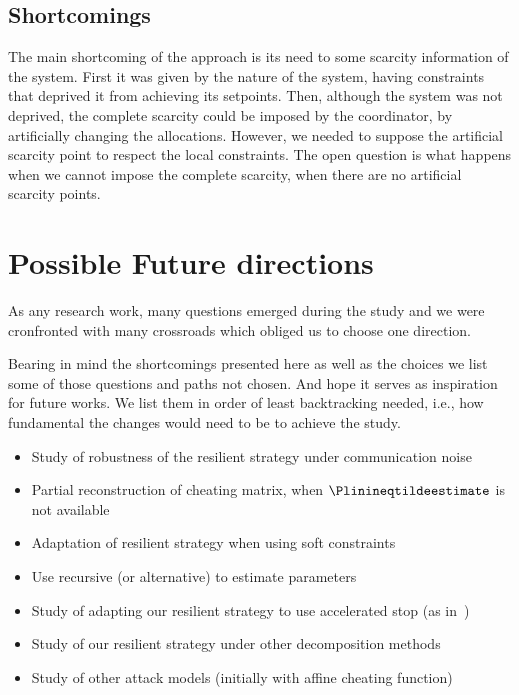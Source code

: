 \documentclass[../main.tex]{subfiles}
\begin{document}
\subsection{Shortcomings}
The main shortcoming of the approach is its need to some scarcity information of the system.
First it was given by the nature of the system, having constraints that deprived it from achieving its setpoints.
Then, although the system was not deprived, the complete scarcity could be imposed by the coordinator, by artificially changing the allocations.
However, we needed to suppose the artificial scarcity point to respect the local constraints.
The open question is what happens when we cannot impose the complete scarcity, when there are no artificial scarcity points.

\section{Possible Future directions}
As any research work, many questions emerged during the study and we were cronfronted with many crossroads which obliged us to choose one direction.

Bearing in mind the shortcomings presented here as well as the choices we list some of those questions and paths not chosen.
And hope it serves as inspiration for future works.
We list them in order of least backtracking needed, i.e., how fundamental the changes would need to be to achieve the study.
\begin{itemize}
  \item Study of robustness of the resilient strategy under communication noise
  \item Partial reconstruction of cheating matrix, when $\Plinineqtildeestimate$ is not available
  \item Adaptation of resilient strategy when using soft constraints~\cite{AlessioBemporad2009}
  \item Use recursive \EM{} (or alternative) to estimate parameters
  \item Study of adapting our resilient strategy to use accelerated stop (as in~\cite{DaiEtAl2017})
  \item Study of our resilient strategy under other decomposition methods
  \item Study of other attack models (initially with affine cheating function)
\end{itemize}
\end{document}
